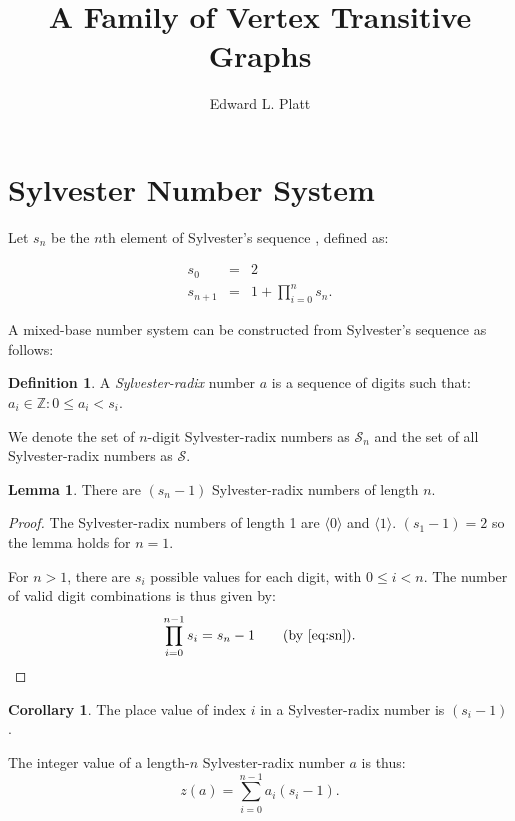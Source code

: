 \documentclass{article}
\title{A Family of Vertex Transitive Graphs}
\author{Edward L. Platt}
\theoremstyle{definition}
\newtheorem{definition}{Definition}[section]
\newtheorem{lemma}{Lemma}
\newtheorem{corollary}{Corollary}
\begin{document}
\maketitle

\section{Sylvester Number System}

Let $s_n$ be the $n$th element of Sylvester's sequence \cite{sylvester1880point}, defined as:

\begin{eqnarray}
s_0 &=& 2 \\
s_{n + 1} &=& 1 + \prod_{i=0}^n s_n. \label{eq:sn}
\end{eqnarray}

A mixed-base number system can be constructed from Sylvester's sequence as follows:
\begin{definition}
A {\em Sylvester-radix} number $a$ is a sequence of digits such that: $a_i \in \mathbb{Z} : 0 \le a_i < s_i$.
\end{definition}

We denote the set of $n$-digit Sylvester-radix numbers as $\mathcal{S}_n$ and the set of all Sylvester-radix numbers as $\mathcal{S}$. 

\begin{lemma}
There are $(s_n - 1)$ Sylvester-radix numbers of length $n$.
\end{lemma}

\begin{proof}
The Sylvester-radix numbers of length 1 are ${\langle}0\rangle$ and ${\langle}1\rangle$. $(s_1 - 1) = 2$ so the lemma holds for $n=1$.

For $n > 1$, there are $s_i$ possible values for each digit, with $0 \le i < n$. The number of valid digit combinations is thus given by:
\begin{equation*}
\prod_{i=0}^{n-1} s_i = s_n - 1 \qquad \text{(by \eqref{eq:sn})}.
\end{equation*}
\end{proof}

\begin{corollary}
The place value of index $i$ in a Sylvester-radix number is $(s_i - 1)$.
\end{corollary}

The integer value of a length-$n$ Sylvester-radix number $a$ is thus:
\begin{equation}
z(a) = \sum_{i=0}^{n-1} a_i (s_i - 1).
\end{equation}
\end{document}
